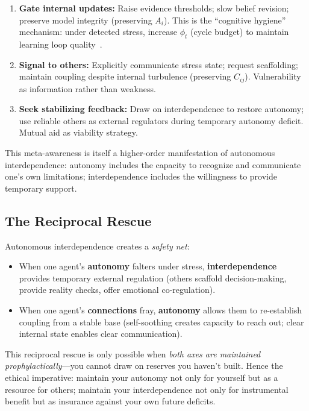 \documentclass[11pt,a4paper]{article}
\begin{document}
\begin{enumerate}
    \item \textbf{Gate internal updates:} Raise evidence thresholds; slow belief revision; preserve model integrity (preserving $A_i$). This is the ``cognitive hygiene'' mechanism: under detected stress, increase $\phi_t$ (cycle budget) to maintain learning loop quality~\cite{arvc}.
    
    \item \textbf{Signal to others:} Explicitly communicate stress state; request scaffolding; maintain coupling despite internal turbulence (preserving $C_{ij}$). Vulnerability as information rather than weakness.
    
    \item \textbf{Seek stabilizing feedback:} Draw on interdependence to restore autonomy; use reliable others as external regulators during temporary autonomy deficit. Mutual aid as viability strategy.
\end{enumerate}

This meta-awareness is itself a higher-order manifestation of autonomous interdependence: autonomy includes the capacity to recognize and communicate one's own limitations; interdependence includes the willingness to provide temporary support.

\subsection{The Reciprocal Rescue}

Autonomous interdependence creates a \emph{safety net}: 
\begin{itemize}
    \item When one agent's \textbf{autonomy} falters under stress, \textbf{interdependence} provides temporary external regulation (others scaffold decision-making, provide reality checks, offer emotional co-regulation).
    
    \item When one agent's \textbf{connections} fray, \textbf{autonomy} allows them to re-establish coupling from a stable base (self-soothing creates capacity to reach out; clear internal state enables clear communication).
\end{itemize}

This reciprocal rescue is only possible when \emph{both axes are maintained prophylactically}---you cannot draw on reserves you haven't built. Hence the ethical imperative: maintain your autonomy not only for yourself but as a resource for others; maintain your interdependence not only for instrumental benefit but as insurance against your own future deficits.
\end{document}
